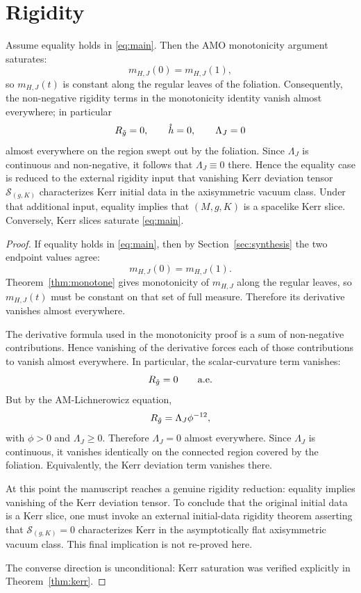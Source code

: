 \section{Rigidity}\label{sec:rigidity}

\begin{theorem}\label{thm:rigidity}
Assume equality holds in \eqref{eq:main}. Then the AMO monotonicity argument saturates:
\[
m_{H,J}(0)=m_{H,J}(1),
\]
so $m_{H,J}(t)$ is constant along the regular leaves of the foliation. Consequently, the non-negative rigidity terms in the monotonicity identity vanish almost everywhere; in particular
\[
R_{\tilde{g}}=0,
\qquad
\mathring{h}=0,
\qquad
\Lambda_J=0
\]
almost everywhere on the region swept out by the foliation. Since $\Lambda_J$ is continuous and non-negative, it follows that $\Lambda_J\equiv 0$ there. Hence the equality case is reduced to the external rigidity input that vanishing Kerr deviation tensor $\mathcal{S}_{(g,K)}$ characterizes Kerr initial data in the axisymmetric vacuum class. Under that additional input, equality implies that $(M,g,K)$ is a spacelike Kerr slice. Conversely, Kerr slices saturate \eqref{eq:main}.
\end{theorem}

\begin{proof}
If equality holds in \eqref{eq:main}, then by Section~\ref{sec:synthesis} the two endpoint values agree:
\[
m_{H,J}(0)=m_{H,J}(1).
\]
Theorem~\ref{thm:monotone} gives monotonicity of $m_{H,J}$ along the regular leaves, so $m_{H,J}(t)$ must be constant on that set of full measure. Therefore its derivative vanishes almost everywhere.

The derivative formula used in the monotonicity proof is a sum of non-negative contributions. Hence vanishing of the derivative forces each of those contributions to vanish almost everywhere. In particular, the scalar-curvature term vanishes:
\[
R_{\tilde{g}}=0 \qquad \text{a.e.}
\]
But by the AM-Lichnerowicz equation,
\[
R_{\tilde{g}}=\Lambda_J \phi^{-12},
\]
with $\phi>0$ and $\Lambda_J\ge 0$. Therefore $\Lambda_J=0$ almost everywhere. Since $\Lambda_J$ is continuous, it vanishes identically on the connected region covered by the foliation. Equivalently, the Kerr deviation term vanishes there.

At this point the manuscript reaches a genuine rigidity reduction: equality implies vanishing of the Kerr deviation tensor. To conclude that the original initial data is a Kerr slice, one must invoke an external initial-data rigidity theorem asserting that $\mathcal{S}_{(g,K)}=0$ characterizes Kerr in the asymptotically flat axisymmetric vacuum class. This final implication is not re-proved here.

The converse direction is unconditional: Kerr saturation was verified explicitly in Theorem~\ref{thm:kerr}.
\end{proof}

